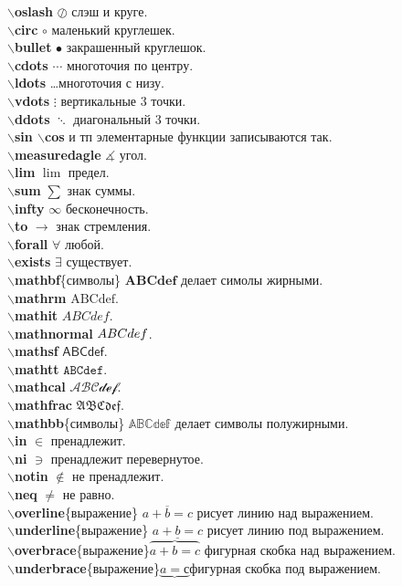 \documentclass{article}
\newcommand{\bs}{$\backslash$}
\newcommand{\bd}[1]{{\bfseries #1}} %
\newcommand{\bb}[1]{\bd{\bs #1}} %
\begin{document}
\bb{oslash} $\oslash$ слэш и круге.\\
\bb{circ} $\circ$ маленький круглешек.\\
\bb{bullet} $\bullet$ закрашенный круглешок.\\
\bb{cdots} $\cdots$ многоточия по центру.\\
\bb{ldots} \ldots многоточия с низу.\\
\bb{vdots} $\vdots$ вертикальные 3 точки.\\
\bb{ddots} $\ddots$ диагональный 3 точки.\\
\bb{sin \bs cos} и тп элементарные функции записываются так.\\
\bb{measuredagle} $\measuredangle$ угол.\\
\bb{lim} $\lim$ предел.\\
\bb{sum} $\sum$ знак суммы.\\
\bb{infty} $\infty$ бесконечность.\\
\bb{to} $\to$ знак стремления.\\
\bb{forall} $\forall$ любой.\\
\bb{exists} $\exists$ существует.\\
\bb{mathbf}\{символы\} $\mathbf{ABCdef}$ делает симолы жирными.\\
\bb{mathrm} $\mathrm{ABCdef}$.\\
\bb{mathit} $\mathit{ABCdef}$.\\
\bb{mathnormal} $\mathnormal{ABCdef}$.\\
\bb{mathsf} $\mathsf{ABCdef}$.\\
\bb{mathtt} $\mathtt{ABCdef}$.\\
\bb{mathcal} $\mathcal{ABCdef}$.\\
\bb{mathfrac} $\mathfrak{ABCdef}$.\\
\bb{mathbb}\{символы\} $\mathbb{ABCdef}$ делает символы полужирными.\\
\bb{in} $\in$ пренадлежит.\\
\bb{ni} $\ni$ пренадлежит перевернутое.\\
\bb{notin} $\notin$ не пренадлежит.\\
\bb{neq} $\neq$ не равно.\\
\bb{overline}\{выражение\} $\overline{a+b=c}$ рисует линию над выражением.\\
\bb{underline}\{выражение\} $\underline{a+b=c}$ рисует линию под выражением.\\
\bb{overbrace}\{выражение\}$\overbrace{a+b=c}$ фигурная скобка над выражением.\\
\bb{underbrace}\{выражение\}$\underbrace{a=с}$фигурная скобка под выражением.\\
\end{document}
